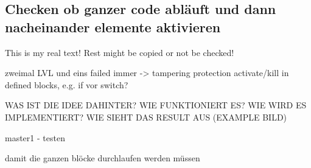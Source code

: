 \subsection{Checken ob ganzer code abläuft und dann nacheinander elemente aktivieren} \label{subsection:counter-modifications-flow}
This is my real text! Rest might be copied or not be checked!


zweimal LVL und eins failed immer -> tampering protection
activate/kill in defined blocks, e.g. if vor switch?




WAS IST DIE IDEE DAHINTER? WIE FUNKTIONIERT ES? WIE WIRD ES IMPLEMENTIERT? WIE SIEHT DAS RESULT AUS (EXAMPLE BILD)\newline

master1 - testen\newline

damit die ganzen blöcke durchlaufen werden müssen
